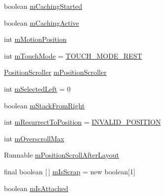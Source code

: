 \begin{DoxyCompactItemize}
\item 
boolean \hyperlink{classit_1_1sephiroth_1_1android_1_1library_1_1widget_1_1_abs_h_list_view_acd333afab4f4b7250c5b9696dd72cec7}{m\+Caching\+Started}
\item 
boolean \hyperlink{classit_1_1sephiroth_1_1android_1_1library_1_1widget_1_1_abs_h_list_view_ac90cc24959204239bf7401b6c6418b03}{m\+Caching\+Active}
\item 
int \hyperlink{classit_1_1sephiroth_1_1android_1_1library_1_1widget_1_1_abs_h_list_view_adb6bc3a8993c445360861053c133d480}{m\+Motion\+Position}
\item 
int \hyperlink{classit_1_1sephiroth_1_1android_1_1library_1_1widget_1_1_abs_h_list_view_aed3f2468c6308a7badcca1ec93ba6b3b}{m\+Touch\+Mode} = \hyperlink{classit_1_1sephiroth_1_1android_1_1library_1_1widget_1_1_abs_h_list_view_a9e07e6f0ddde44e23ad0b53ecc476071}{T\+O\+U\+C\+H\+\_\+\+M\+O\+D\+E\+\_\+\+R\+E\+ST}
\item 
\hyperlink{classit_1_1sephiroth_1_1android_1_1library_1_1widget_1_1_abs_h_list_view_1_1_position_scroller}{Position\+Scroller} \hyperlink{classit_1_1sephiroth_1_1android_1_1library_1_1widget_1_1_abs_h_list_view_a60398f89774a190d4407ecdc12703285}{m\+Position\+Scroller}
\item 
int \hyperlink{classit_1_1sephiroth_1_1android_1_1library_1_1widget_1_1_abs_h_list_view_a51c9d7ca93d29efb3aa36bd3727670d7}{m\+Selected\+Left} = 0
\item 
boolean \hyperlink{classit_1_1sephiroth_1_1android_1_1library_1_1widget_1_1_abs_h_list_view_a89762e1e5a4d043989c69c4a01c70e8b}{m\+Stack\+From\+Right}
\item 
int \hyperlink{classit_1_1sephiroth_1_1android_1_1library_1_1widget_1_1_abs_h_list_view_a3fe4851ccce12793a6649619cc78fa97}{m\+Resurrect\+To\+Position} = \hyperlink{classit_1_1sephiroth_1_1android_1_1library_1_1widget_1_1_adapter_view_a2751b7d592638baeaf149f6da0d4e598}{I\+N\+V\+A\+L\+I\+D\+\_\+\+P\+O\+S\+I\+T\+I\+ON}
\item 
int \hyperlink{classit_1_1sephiroth_1_1android_1_1library_1_1widget_1_1_abs_h_list_view_a2c232590ff108e7f74890b2343db3676}{m\+Overscroll\+Max}
\item 
Runnable \hyperlink{classit_1_1sephiroth_1_1android_1_1library_1_1widget_1_1_abs_h_list_view_afa4e635b441d64fd3a1ca8efd349839b}{m\+Position\+Scroll\+After\+Layout}
\item 
final boolean \mbox{[}$\,$\mbox{]} \hyperlink{classit_1_1sephiroth_1_1android_1_1library_1_1widget_1_1_abs_h_list_view_aa88fd1ee7c86911effca28ac69a9e268}{m\+Is\+Scrap} = new boolean\mbox{[}1\mbox{]}
\item 
boolean \hyperlink{classit_1_1sephiroth_1_1android_1_1library_1_1widget_1_1_abs_h_list_view_a3c879d803f8dbecf7e2e0216e82e89bd}{m\+Is\+Attached}
\end{DoxyCompactItemize}
